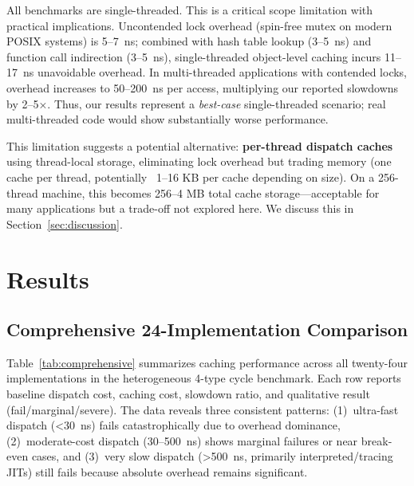 \documentclass[sigplan,final,acmsmall,review,screen]{acmart}
\begin{document}
All benchmarks are single-threaded. This is a critical scope limitation with practical implications. Uncontended lock overhead
(spin-free mutex on modern POSIX systems) is 5--7~ns; combined with hash table lookup (3--5~ns) and function call indirection (3--5~ns),
single-threaded object-level caching incurs 11--17~ns unavoidable overhead. In multi-threaded applications with contended locks, overhead
increases to 50--200~ns per access, multiplying our reported slowdowns by 2--5×. Thus, our results represent a \emph{best-case}
single-threaded scenario; real multi-threaded code would show substantially worse performance.

This limitation suggests a potential alternative: \textbf{per-thread dispatch caches} using thread-local storage, eliminating lock overhead
but trading memory (one cache per thread, potentially ~1--16 KB per cache depending on size). On a 256-thread machine, this becomes 256--4 MB
total cache storage—acceptable for many applications but a trade-off not explored here. We discuss this in Section~\ref{sec:discussion}.

\section{Results}

\subsection{Comprehensive 24-Implementation Comparison}

Table~\ref{tab:comprehensive} summarizes caching performance across all twenty-four implementations in the heterogeneous 4-type cycle benchmark. Each row reports baseline dispatch cost, caching cost, slowdown ratio, and qualitative result (fail/marginal/severe). The data reveals three consistent patterns: (1)~ultra-fast dispatch (<30~ns) fails catastrophically due to overhead dominance, (2)~moderate-cost dispatch (30--500~ns) shows marginal failures or near break-even cases, and (3)~very slow dispatch (>500~ns, primarily interpreted/tracing JITs) still fails because absolute overhead remains significant.
\end{document}
